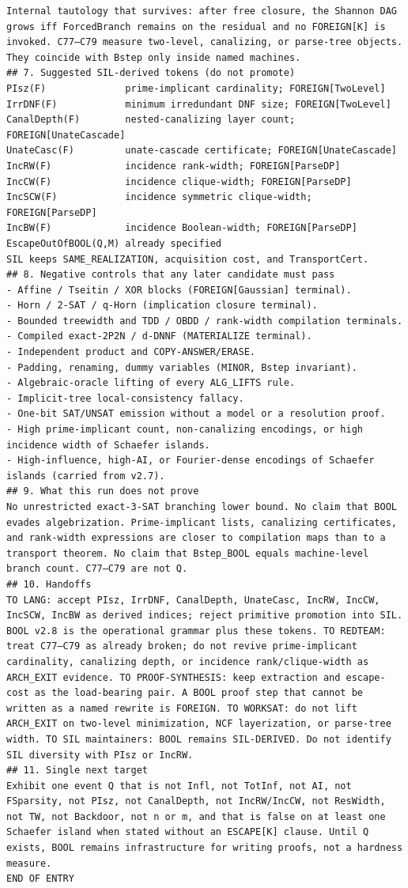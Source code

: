 \documentclass[11pt]{article}
\begin{document}
\begin{Verbatim}[breaklines=true,breakanywhere=true]
Internal tautology that survives: after free closure, the Shannon DAG grows iff ForcedBranch remains on the residual and no FOREIGN[K] is invoked. C77–C79 measure two-level, canalizing, or parse-tree objects. They coincide with Bstep only inside named machines.
## 7. Suggested SIL-derived tokens (do not promote)
PIsz(F)              prime-implicant cardinality; FOREIGN[TwoLevel]
IrrDNF(F)            minimum irredundant DNF size; FOREIGN[TwoLevel]
CanalDepth(F)        nested-canalizing layer count; FOREIGN[UnateCascade]
UnateCasc(F)         unate-cascade certificate; FOREIGN[UnateCascade]
IncRW(F)             incidence rank-width; FOREIGN[ParseDP]
IncCW(F)             incidence clique-width; FOREIGN[ParseDP]
IncSCW(F)            incidence symmetric clique-width; FOREIGN[ParseDP]
IncBW(F)             incidence Boolean-width; FOREIGN[ParseDP]
EscapeOutOfBOOL(Q,M) already specified
SIL keeps SAME_REALIZATION, acquisition cost, and TransportCert.
## 8. Negative controls that any later candidate must pass
- Affine / Tseitin / XOR blocks (FOREIGN[Gaussian] terminal).
- Horn / 2-SAT / q-Horn (implication closure terminal).
- Bounded treewidth and TDD / OBDD / rank-width compilation terminals.
- Compiled exact-2P2N / d-DNNF (MATERIALIZE terminal).
- Independent product and COPY-ANSWER/ERASE.
- Padding, renaming, dummy variables (MINOR, Bstep invariant).
- Algebraic-oracle lifting of every ALG_LIFTS rule.
- Implicit-tree local-consistency fallacy.
- One-bit SAT/UNSAT emission without a model or a resolution proof.
- High prime-implicant count, non-canalizing encodings, or high incidence width of Schaefer islands.
- High-influence, high-AI, or Fourier-dense encodings of Schaefer islands (carried from v2.7).
## 9. What this run does not prove
No unrestricted exact-3-SAT branching lower bound. No claim that BOOL evades algebrization. Prime-implicant lists, canalizing certificates, and rank-width expressions are closer to compilation maps than to a transport theorem. No claim that Bstep_BOOL equals machine-level branch count. C77–C79 are not Q.
## 10. Handoffs
TO LANG: accept PIsz, IrrDNF, CanalDepth, UnateCasc, IncRW, IncCW, IncSCW, IncBW as derived indices; reject primitive promotion into SIL. BOOL v2.8 is the operational grammar plus these tokens. TO REDTEAM: treat C77–C79 as already broken; do not revive prime-implicant cardinality, canalizing depth, or incidence rank/clique-width as ARCH_EXIT evidence. TO PROOF-SYNTHESIS: keep extraction and escape-cost as the load-bearing pair. A BOOL proof step that cannot be written as a named rewrite is FOREIGN. TO WORKSAT: do not lift ARCH_EXIT on two-level minimization, NCF layerization, or parse-tree width. TO SIL maintainers: BOOL remains SIL-DERIVED. Do not identify SIL diversity with PIsz or IncRW.
## 11. Single next target
Exhibit one event Q that is not Infl, not TotInf, not AI, not FSparsity, not PIsz, not CanalDepth, not IncRW/IncCW, not ResWidth, not TW, not Backdoor, not n or m, and that is false on at least one Schaefer island when stated without an ESCAPE[K] clause. Until Q exists, BOOL remains infrastructure for writing proofs, not a hardness measure.
END OF ENTRY
\end{Verbatim}
\end{document}
